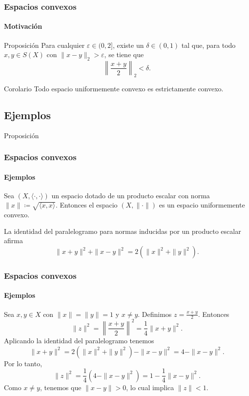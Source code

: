 \documentclass[aspectratio=169]{beamer}
\begin{document}
\begin{frame}
  \frametitle{Espacios convexos}
  \framesubtitle{Motivación}
  \begin{block}{Proposición}
    Para cualquier $\varepsilon \in (0,2]$, existe un $\delta \in (0,1)$ tal que, para todo $x, y \in S(X)$ con $\|x - y\|_2 > \varepsilon$, se tiene que
    \begin{equation}
        \left\| \frac{x + y}{2} \right\|_2 < \delta.
    \end{equation}
  \end{block}
  \begin{block}{Corolario}
    Todo espacio uniformemente convexo es estrictamente convexo.
  \end{block}
\end{frame}

\subsection{Ejemplos}

\begin{frame}
  \begin{block}{Proposición}
    \frametitle{Espacios convexos}
    \framesubtitle{Ejemplos}
    Sea $ (X, \langle \cdot, \cdot \rangle) $ un espacio dotado de un producto escalar con norma $ \|x\| \coloneq \sqrt{\langle x, x \rangle} $. Entonces el espacio $ (X, \|\cdot\|) $ es un espacio uniformemente convexo.
  \end{block}
  La identidad del paralelogramo para normas inducidas por un producto escalar afirma
    \begin{equation}
        \|x + y\|^2 + \|x - y\|^2 = 2(\|x\|^2 + \|y\|^2).
    \end{equation}
\end{frame}

\begin{frame}
  \frametitle{Espacios convexos}
    \framesubtitle{Ejemplos}
    Sea \(x, y \in X\) con \(\|x\| = \|y\| = 1\) y \(x \neq y\). Definimos \(z = \frac{x + y}{2}\).  
    Entonces
    \begin{equation}
    \|z\|^2 = \left\|\frac{x + y}{2}\right\|^2 = \frac{1}{4} \|x + y\|^2.
    \end{equation}
    Aplicando la identidad del paralelogramo tenemos
    \begin{equation}
    \|x + y\|^2 = 2(\|x\|^2 + \|y\|^2) - \|x - y\|^2 = 4 - \|x - y\|^2.
    \end{equation}
    Por lo tanto,
    \begin{equation}
    \|z\|^2 = \frac{1}{4}(4 - \|x - y\|^2) = 1 - \frac{1}{4} \|x - y\|^2.
    \end{equation}
    Como \(x \neq y\), tenemos que \(\|x - y\| > 0\), lo cual implica $ \|z\| < 1 $.
\end{frame}
\end{document}
